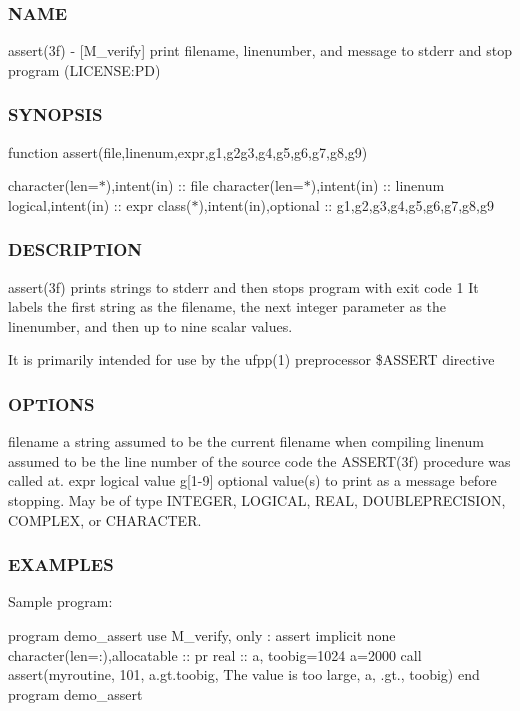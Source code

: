 \subsubsection*{N\+A\+ME}

assert(3f) -\/ \mbox{[}M\+\_\+verify\mbox{]} print filename, linenumber, and message to stderr and stop program (L\+I\+C\+E\+N\+SE\+:PD) \subsubsection*{S\+Y\+N\+O\+P\+S\+IS}

function assert(file,linenum,expr,g1,g2g3,g4,g5,g6,g7,g8,g9)

character(len=$\ast$),intent(in) \+:\+: file character(len=$\ast$),intent(in) \+:\+: linenum logical,intent(in) \+:\+: expr class($\ast$),intent(in),optional \+:\+: g1,g2,g3,g4,g5,g6,g7,g8,g9 \subsubsection*{D\+E\+S\+C\+R\+I\+P\+T\+I\+ON}

assert(3f) prints strings to stderr and then stops program with exit code 1 It labels the first string as the filename, the next integer parameter as the linenumber, and then up to nine scalar values.

It is primarily intended for use by the ufpp(1) preprocessor \$\+A\+S\+S\+E\+RT directive

\subsubsection*{O\+P\+T\+I\+O\+NS}

\begin{DoxyVerb}filename   a string assumed to be the current filename when compiling
linenum    assumed to be the line number of the source code the ASSERT(3f)
           procedure was called at.
expr       logical value
g[1-9]  optional value(s) to print as a message before stopping. May
        be of type INTEGER, LOGICAL, REAL, DOUBLEPRECISION, COMPLEX,
        or CHARACTER.
\end{DoxyVerb}


\subsubsection*{E\+X\+A\+M\+P\+L\+ES}

Sample program\+:

program demo\+\_\+assert use M\+\_\+verify, only \+: assert implicit none character(len=\+:),allocatable \+:\+: pr real \+:\+: a, toobig=1024 a=2000 call assert(\textquotesingle{}myroutine\textquotesingle{}, 101, a.\+gt.\+toobig, \textquotesingle{}The value is too large\textquotesingle{}, a, \textquotesingle{}.gt.\textquotesingle{}, toobig) end program demo\+\_\+assert

